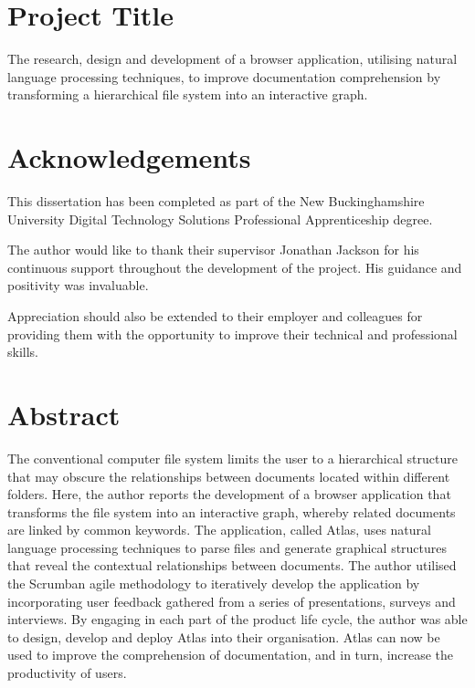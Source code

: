 \documentclass{article}
\begin{document}
\newpage

\section*{Project Title}
The research, design and development of a browser application, utilising natural language processing techniques, to improve documentation comprehension by transforming a hierarchical file system into an interactive graph.

\newpage

\section*{Acknowledgements}
This dissertation has been completed as part of the New Buckinghamshire University Digital Technology Solutions Professional Apprenticeship degree.

The author would like to thank their supervisor Jonathan Jackson for his continuous support throughout the development of the project. His guidance and positivity was invaluable.

Appreciation should also be extended to their employer and colleagues for providing them with the opportunity to improve their technical and professional skills.

\newpage

\section*{Abstract}
The conventional computer file system limits the user to a hierarchical structure that may obscure the relationships between documents located within different folders. Here, the author reports the development of a browser application that transforms the file system into an interactive graph, whereby related documents are linked by common keywords. The application, called Atlas, uses natural language processing techniques to parse files and generate graphical structures that reveal the contextual relationships between documents. The author utilised the Scrumban agile methodology to iteratively develop the application by incorporating user feedback gathered from a series of presentations, surveys and interviews. By engaging in each part of the product life cycle, the author was able to design, develop and deploy Atlas into their organisation. Atlas can now be used to improve the comprehension of documentation, and in turn, increase the productivity of users.
\end{document}
